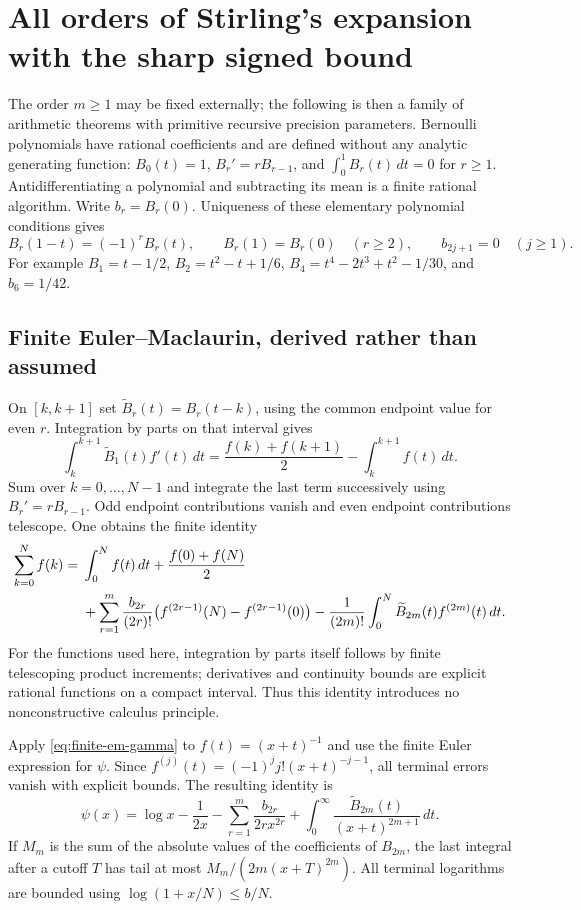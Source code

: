 \section{All orders of Stirling's expansion with the sharp signed bound}
\label{sec:all-order-stirling}

The order $m\ge1$ may be fixed externally; the following is then a family
of arithmetic theorems with primitive recursive precision parameters.
Bernoulli polynomials have rational coefficients and are defined without
any analytic generating function: $B_0(t)=1$, $B_r'=rB_{r-1}$, and
$\int_0^1 B_r(t)\,dt=0$ for $r\ge1$.  Antidifferentiating a polynomial
and subtracting its mean is a finite rational algorithm.  Write
$b_r=B_r(0)$.  Uniqueness of these elementary polynomial conditions gives
\[
 B_r(1-t)=(-1)^r B_r(t),\qquad
 B_r(1)=B_r(0)\quad(r\ge2),\qquad b_{2j+1}=0\quad(j\ge1).
\]
For example $B_1=t-1/2$, $B_2=t^2-t+1/6$,
$B_4=t^4-2t^3+t^2-1/30$, and $b_6=1/42$.

\subsection{Finite Euler--Maclaurin, derived rather than assumed}

On $[k,k+1]$ set $\widetilde B_r(t)=B_r(t-k)$, using the common endpoint
value for even $r$.  Integration by parts on that interval gives
\[
 \int_k^{k+1}\widetilde B_1(t)f'(t)\,dt
 =\frac{f(k)+f(k+1)}2-\int_k^{k+1}f(t)\,dt.
\]
Sum over $k=0,\ldots,N-1$ and integrate the last term successively using
$B_r'=rB_{r-1}$.  Odd endpoint contributions vanish and even endpoint
contributions telescope.  One obtains the finite identity
\begin{align}
 \sum_{k=0}^{N}f(k)
 ={}&\int_0^N f(t)\,dt+\frac{f(0)+f(N)}2\notag\\
 &+\sum_{r=1}^{m}\frac{b_{2r}}{(2r)!}
       \bigl(f^{(2r-1)}(N)-f^{(2r-1)}(0)\bigr)
 -\frac1{(2m)!}\int_0^N\widetilde B_{2m}(t)f^{(2m)}(t)\,dt.
 \label{eq:finite-em-gamma}
\end{align}
For the functions used here, integration by parts itself follows by
finite telescoping product increments; derivatives and continuity bounds
are explicit rational functions on a compact interval.  Thus this
identity introduces no nonconstructive calculus principle.

Apply \eqref{eq:finite-em-gamma} to $f(t)=(x+t)^{-1}$ and use the finite
Euler expression for $\psi$.  Since
$f^{(j)}(t)=(-1)^j j!(x+t)^{-j-1}$, all terminal errors vanish with
explicit bounds.  The resulting identity is
\begin{equation}\label{eq:psi-em-exact}
 \psi(x)=\log x-\frac1{2x}
 -\sum_{r=1}^{m}\frac{b_{2r}}{2r x^{2r}}
 +\int_0^\infty\frac{\widetilde B_{2m}(t)}{(x+t)^{2m+1}}\,dt.
\end{equation}
If $M_m$ is the sum of the absolute values of the coefficients of
$B_{2m}$, the last integral after a cutoff $T$ has tail at most
$M_m/(2m(x+T)^{2m})$.  All terminal logarithms are bounded using
$\log(1+x/N)\le b/N$.

